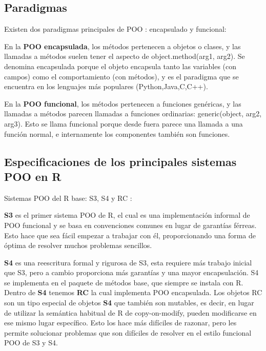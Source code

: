 \documentclass[
]{book}
\begin{document}
\hypertarget{paradigmas}{%
\subsection{Paradigmas}\label{paradigmas}}

Existen dos paradigmas principales de POO : encapsulado y funcional:

En la \textbf{POO encapsulada}, los métodos pertenecen a objetos o clases, y las llamadas a métodos suelen tener el aspecto de object.method(arg1, arg2). Se denomina encapsulada porque el objeto encapsula tanto las variables (con campos) como el comportamiento (con métodos), y es el paradigma que se encuentra en los lenguajes más populares (Python,Java,C,C++).

En la \textbf{POO funcional}, los métodos pertenecen a funciones genéricas, y las llamadas a métodos parecen llamadas a funciones ordinarias: generic(object, arg2, arg3). Esto se llama funcional porque desde fuera parece una llamada a una función normal, e internamente los componentes también son funciones.

\hypertarget{especificaciones-de-los-principales-sistemas-poo-en-r}{%
\subsection{Especificaciones de los principales sistemas POO en R}\label{especificaciones-de-los-principales-sistemas-poo-en-r}}

Sistemas POO del R base: S3, S4 y RC :

\textbf{S3} es el primer sistema POO de R, el cual es una implementación informal de POO funcional y se basa en convenciones comunes en lugar de garantías férreas. Esto hace que sea fácil empezar a trabajar con él, proporcionando una forma de óptima de resolver muchos problemas sencillos.

\textbf{S4} es una reescritura formal y rigurosa de S3, esta requiere más trabajo inicial que S3, pero a cambio proporciona más garantías y una mayor encapsulación. S4 se implementa en el paquete de métodos base, que siempre se instala con R. Dentro de \textbf{S4} tenemos \textbf{RC} la cual implementa POO encapsulada. Los objetos RC son un tipo especial de objetos \textbf{S4} que también son mutables, es decir, en lugar de utilizar la semántica habitual de R de copy-on-modify, pueden modificarse en ese mismo lugar específico. Esto los hace más difíciles de razonar, pero les permite solucionar problemas que son difíciles de resolver en el estilo funcional POO de S3 y S4.
\end{document}
